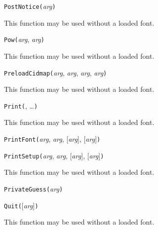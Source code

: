 

\texttt{PostNotice(}\textit{arg}\texttt{)}

This function may be used without a loaded font.



\texttt{Pow(}\textit{arg}, \textit{arg}\texttt{)}

This function may be used without a loaded font.



\texttt{PreloadCidmap(}\textit{arg}, \textit{arg}, \textit{arg}, \textit{arg}\texttt{)}

This function may be used without a loaded font.



\texttt{Print(}, \ldots\texttt{)}

This function may be used without a loaded font.



\texttt{PrintFont(}\textit{arg}, \textit{arg}, [\textit{arg}], [\textit{arg}]\texttt{)}



\texttt{PrintSetup(}\textit{arg}, \textit{arg}, [\textit{arg}], [\textit{arg}]\texttt{)}

This function may be used without a loaded font.



\texttt{PrivateGuess(}\textit{arg}\texttt{)}



\texttt{Quit(}[\textit{arg}]\texttt{)}

This function may be used without a loaded font.



